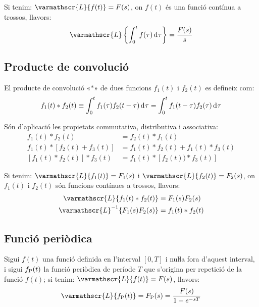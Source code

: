 Si tenim: $\varmathscr{L} \{f(t) \} = F(s)$, on $f(t)$ és una
funció contínua a trossos, 
llavors:
\begin{align}
    \varmathscr{L} \left\lbrace  \int_0^t f(\tau) \diff \tau \right\rbrace  = \frac{F(s)}{s}
\end{align}

\subsection{Producte de convolució}\label{sec:prod-convolucio}

El producte de convolució «$*$» de dues funcions $f_1(t)$ i $f_2(t)$ es
defineix com:
\begin{equation}
    f_1(t) * f_2(t) \equiv \int_0^t f_1(\tau) f_2(t-\tau) \diff\tau =
    \int_0^t f_1(t-\tau) f_2(\tau) \diff\tau
\end{equation}

Són d'aplicació les propietats commutativa, distributiva i associativa:
\begin{subequations}
	\begin{align}
		f_1(t) * f_2(t) &= f_2(t) * f_1(t) \\
		f_1(t) * [f_2(t) + f_3(t)] &= f_1(t) * f_2(t) + f_1(t) * f_3(t)\\
	    [f_1(t) * f_2(t)] * f_3(t) &=  f_1(t) * [f_2(t)) * f_3(t)]
	\end{align}
\end{subequations}

Si tenim: $\varmathscr{L} \{f_1(t) \} = F_1(s)$ i $\varmathscr{L}
\{f_2(t) \} = F_2(s)$, on $f_1(t)$ i $f_2(t)$ són funcions
contínues a trossos, llavors:
\begin{align}
    \varmathscr{L} \{ f_1(t) * f_2(t) \} &= F_1(s) F_2(s)\\
    \varmathscr{L}^{-1} \{ F_1(s) F_2(s) \} &= f_1(t) * f_2(t)
\end{align}

\subsection{Funció periòdica}

Sigui $f(t)$ una funció definida en l'interval $[0,T]$ i nuŀla
fora d'aquest interval, i sigui $f_\mathrm{P}(t)$ la funció periòdica de
període $T$ que s'origina per repetició de la funció $f(t)$; si
tenim: $\varmathscr{L} \{f(t) \} = F(s)$, llavors:
\begin{equation}
   \varmathscr{L} \{f\ped{P}(t) \} = F\ped{P}(s) = \frac{F(s)}{1-e^{-sT}}
\end{equation}

